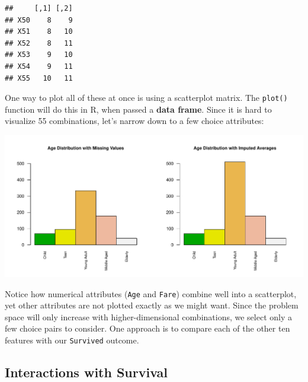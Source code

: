 \documentclass[]{article}
\newenvironment{Shaded}{\begin{snugshade}}{\end{snugshade}}
\newcommand{\KeywordTok}[1]{\textcolor[rgb]{0.13,0.29,0.53}{\textbf{#1}}}
\newcommand{\StringTok}[1]{\textcolor[rgb]{0.31,0.60,0.02}{#1}}
\newcommand{\CommentTok}[1]{\textcolor[rgb]{0.56,0.35,0.01}{\textit{#1}}}
\newcommand{\OperatorTok}[1]{\textcolor[rgb]{0.81,0.36,0.00}{\textbf{#1}}}
\newcommand{\NormalTok}[1]{#1}
\begin{document}
\begin{verbatim}
##     [,1] [,2]
## X50    8    9
## X51    8   10
## X52    8   11
## X53    9   10
## X54    9   11
## X55   10   11
\end{verbatim}

One way to plot all of these at once is using a scatterplot matrix. The
\texttt{plot()} function will do this in R, when passed a \textbf{data
frame}. Since it is hard to visualize 55 combinations, let's narrow down
to a few choice attributes:

\begin{Shaded}
\end{Shaded}

\includegraphics{Titanic_Survival_files/figure-latex/unnamed-chunk-21-1.pdf}

Notice how numerical attributes (\texttt{Age} and \texttt{Fare}) combine
well into a scatterplot, yet other attributes are not plotted exactly as
we might want. Since the problem space will only increase with
higher-dimensional combinations, we select only a few choice pairs to
consider. One approach is to compare each of the other ten features with
our \texttt{Survived} outcome.

\subsection{Interactions with
Survival}\label{interactions-with-survival}
\end{document}
